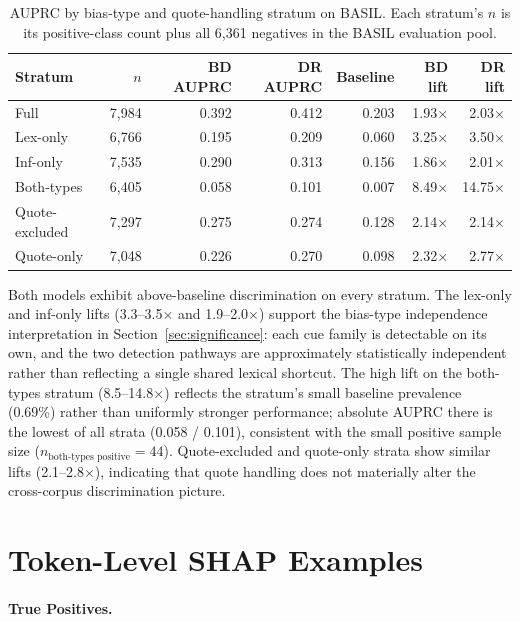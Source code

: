 \documentclass[11pt]{article}
\begin{document}
\begin{table}[t]
\centering
\begin{tabular}{lrrrrrr}
\toprule
Stratum & $n$ & BD AUPRC & DR AUPRC & Baseline & BD lift & DR lift \\
\midrule
Full           & 7,984 & 0.392 & 0.412 & 0.203 & 1.93$\times$ & 2.03$\times$  \\
Lex-only       & 6,766 & 0.195 & 0.209 & 0.060 & 3.25$\times$ & 3.50$\times$  \\
Inf-only       & 7,535 & 0.290 & 0.313 & 0.156 & 1.86$\times$ & 2.01$\times$  \\
Both-types     & 6,405 & 0.058 & 0.101 & 0.007 & 8.49$\times$ & 14.75$\times$ \\
Quote-excluded & 7,297 & 0.275 & 0.274 & 0.128 & 2.14$\times$ & 2.14$\times$  \\
Quote-only     & 7,048 & 0.226 & 0.270 & 0.098 & 2.32$\times$ & 2.77$\times$  \\
\bottomrule
\end{tabular}
\caption{AUPRC by bias-type and quote-handling stratum on BASIL. Each 
stratum's $n$ is its positive-class count plus all 6,361 negatives in 
the BASIL evaluation pool.}
\label{tab:auprc_strata}
\end{table}

Both models exhibit above-baseline discrimination on every stratum. 
The lex-only and inf-only lifts (3.3--3.5$\times$ and 
1.9--2.0$\times$) support the bias-type independence interpretation in 
Section~\ref{sec:significance}: each cue family is detectable on its 
own, and the two detection pathways are approximately statistically 
independent rather than reflecting a single shared lexical shortcut. 
The high lift on the both-types stratum (8.5--14.8$\times$) reflects 
the stratum's small baseline prevalence (0.69\%) rather than 
uniformly stronger performance; absolute AUPRC there is the lowest of 
all strata (0.058 / 0.101), consistent with the small positive sample 
size ($n_\text{both-types positive} = 44$). Quote-excluded and 
quote-only strata show similar lifts (2.1--2.8$\times$), indicating 
that quote handling does not materially alter the cross-corpus 
discrimination picture.

\section{Token-Level SHAP Examples}
\paragraph{True Positives.}
\end{document}
